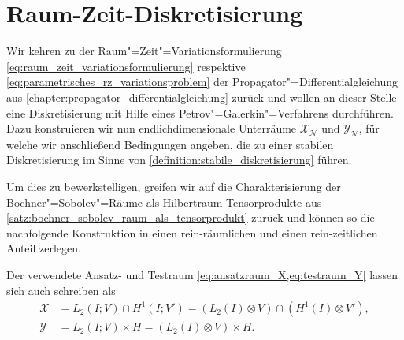 \documentclass[../main.tex]{subfiles}
\begin{document}
\section{Raum-Zeit-Diskretisierung} %
\label{section:raum_zeit_diskretisierung}

Wir kehren zu der Raum"=Zeit"=Variationsformulierung \cref{eq:raum_zeit_variationsformulierung} respektive \cref{eq:parametrisches_rz_variationsproblem} der Propagator"=Differentialgleichung aus \cref{chapter:propagator_differentialgleichung} zurück und wollen an dieser Stelle eine Diskretisierung mit Hilfe eines Petrov"=Galerkin"=Verfahrens durchführen.
Dazu konstruieren wir nun endlichdimensionale Unterräume $\mathcal X_{\mathcal N}$ und $\mathcal Y_{\mathcal N}$, für welche wir anschließend Bedingungen angeben, die zu einer stabilen Diskretisierung im Sinne von \cref{definition:stabile_diskretisierung} führen.

Um dies zu bewerkstelligen, greifen wir auf die Charakterisierung der Bochner"=Sobolev"=Räume als Hilbertraum-Tensorprodukte aus \cref{satz:bochner_sobolev_raum_als_tensorprodukt} zurück und können so die nachfolgende Konstruktion in einen rein-räumlichen und einen rein-zeitlichen Anteil zerlegen.

\begin{Korollar}
    Der verwendete Ansatz- und Testraum \cref{eq:ansatzraum_X,eq:testraum_Y} lassen sich auch schreiben als
    \begin{equation}
        \label{eq:ansatzraum_testraum_tensor}
        \begin{aligned}
        \mathcal X &= L_{2}(I; V) \cap H^{1}(I; V')
            = (L_2(I) \otimes V) \cap (H^{1}(I) \otimes V'),\\
        \mathcal Y &= L_{2}(I; V) \times H = (L_{2}(I) \otimes V) \times H.
        \end{aligned}
    \end{equation}
\end{Korollar}
\end{document}
